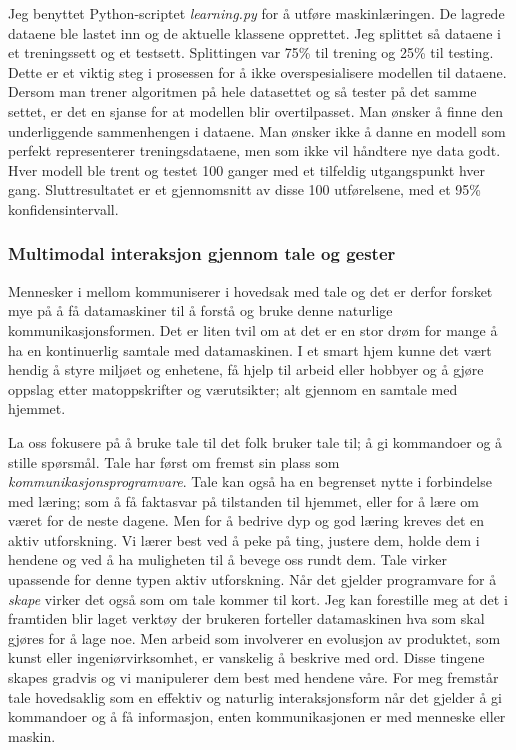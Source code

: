 Jeg benyttet Python-scriptet \emph{learning.py} for å utføre maskinlæringen. De lagrede dataene ble lastet inn og de aktuelle klassene opprettet. Jeg splittet så dataene i et treningssett og et testsett. Splittingen var 75\% til trening og 25\% til testing. Dette er et viktig steg i prosessen for å ikke overspesialisere modellen til dataene. Dersom man trener algoritmen på hele datasettet og så tester på det samme settet, er det en sjanse for at modellen blir overtilpasset. Man ønsker å finne den underliggende sammenhengen i dataene. Man ønsker ikke å danne en modell som perfekt representerer treningsdataene, men som ikke vil håndtere nye data godt. Hver modell ble trent og testet 100 ganger med et tilfeldig utgangspunkt hver gang. Sluttresultatet er et gjennomsnitt av disse 100 utførelsene, med et 95\% konfidensintervall.\\

\subsubsection*{Multimodal interaksjon gjennom tale og gester}
Mennesker i mellom kommuniserer i hovedsak med tale og det er derfor forsket mye på å få datamaskiner til å forstå og bruke denne naturlige kommunikasjonsformen. Det er liten tvil om at det er en stor drøm for mange å ha en kontinuerlig samtale med datamaskinen. I et smart hjem kunne det vært hendig å styre miljøet og enhetene, få hjelp til arbeid eller hobbyer og å gjøre oppslag etter matoppskrifter og værutsikter; alt gjennom en samtale med hjemmet.

La oss fokusere på å bruke tale til det folk bruker tale til; å gi kommandoer og å stille spørsmål. Tale har først om fremst sin plass som \emph{kommunikasjonsprogramvare}. Tale kan også ha en begrenset nytte i forbindelse med læring; som å få faktasvar på tilstanden til hjemmet, eller for å lære om været for de neste dagene. Men for å bedrive dyp og god læring kreves det en aktiv utforskning. Vi lærer best ved å peke på ting, justere dem, holde dem i hendene og ved å ha muligheten til å bevege oss rundt dem. Tale virker upassende for denne typen aktiv utforskning. Når det gjelder programvare for å \emph{skape} virker det også som om tale kommer til kort. Jeg kan forestille meg at det i framtiden blir laget verktøy der brukeren forteller datamaskinen hva som skal gjøres for å lage noe. Men arbeid som involverer en evolusjon av produktet, som kunst eller ingeniørvirksomhet, er vanskelig å beskrive med ord. Disse tingene skapes gradvis og vi manipulerer dem best med hendene våre. For meg fremstår tale hovedsaklig som en effektiv og naturlig interaksjonsform når det gjelder å gi kommandoer og å få informasjon, enten kommunikasjonen er med menneske eller maskin.

